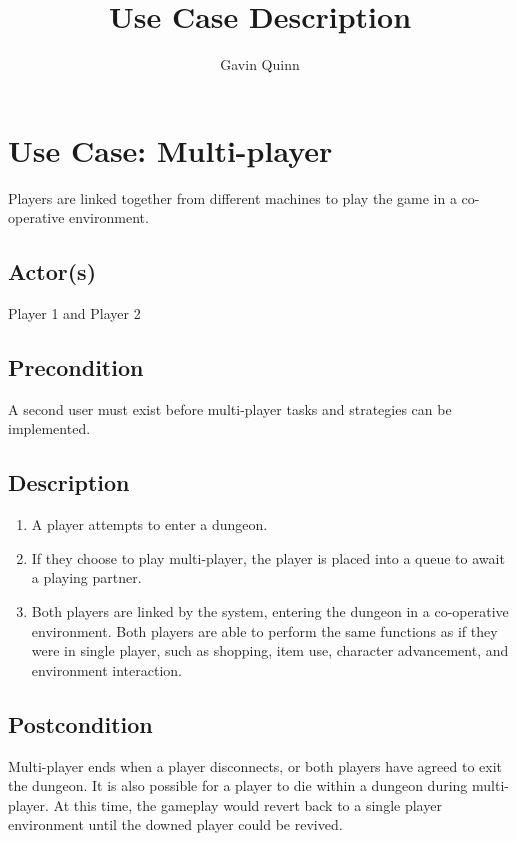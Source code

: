 \documentclass[11pt]{article}
\title{Use Case Description}
\author{Gavin Quinn}
\begin{document}
    \maketitle

    \section{Use Case: Multi-player}
	Players are linked together from different machines to play the game in a co-operative environment.

		\subsection{Actor(s)}
		
			Player 1 and Player 2

		\subsection{Precondition}
 
			A second user must exist before multi-player tasks and strategies can be implemented.
	
		\subsection{Description}
			\begin{enumerate}
			\item A player attempts to enter a dungeon.
			\item If they choose to play multi-player, the player is placed into a queue to await a playing partner.
			\item Both players are linked by the system, entering the dungeon in a co-operative environment. Both players are able to perform the same functions as if they were in single player, such as shopping, item use, character advancement, and environment interaction.
			\end{enumerate}

		\subsection{Postcondition}
		
			Multi-player ends when a player disconnects, or both players have agreed to exit the dungeon. It is also possible for a player to die within a dungeon during multi-player. At this time, the gameplay would revert back to a single player environment until the downed player could be revived. 
\end{document}

